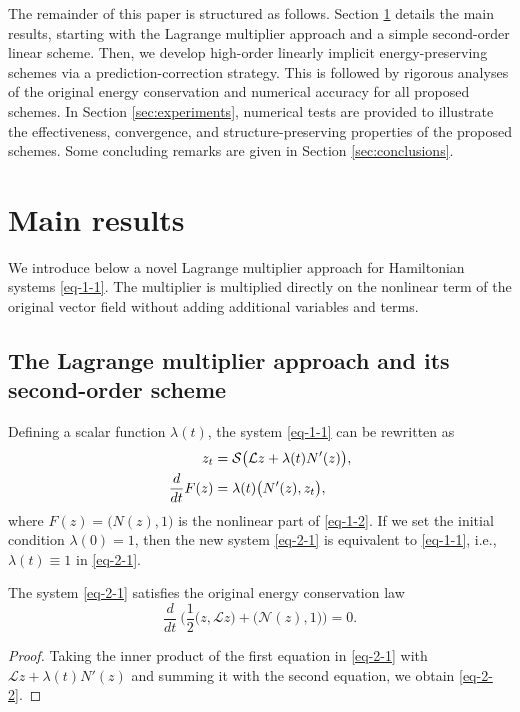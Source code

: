 \documentclass[onefignum,onetabnum]{siamart}
\begin{document}
The remainder of this paper is structured as follows. Section \ref{sec:main} details the main results, starting with the Lagrange multiplier approach and a simple second-order linear scheme. Then, we develop high-order linearly implicit energy-preserving schemes via a prediction-correction strategy. This is followed by rigorous analyses of the original energy conservation and numerical accuracy for all proposed schemes. In Section \ref{sec:experiments}, numerical tests are provided to illustrate the effectiveness, convergence, and structure-preserving properties of the proposed schemes. Some concluding remarks are given in Section \ref{sec:conclusions}. 

\section{Main results}\label{sec:main}
We introduce below a novel Lagrange multiplier approach for Hamiltonian systems \eqref{eq-1-1}. The multiplier is multiplied directly on the nonlinear term of the original vector field without adding additional variables and terms.
\subsection{The Lagrange multiplier approach and its second-order scheme} 
Defining a scalar function $\lambda(t)$, the system \eqref{eq-1-1} can be rewritten as
\begin{align}\label{eq-2-1}
	\aligned
	z_t&=\mathcal{S}\big(\mathcal{L}z+\lambda(t)N'(z)\big),\\
	\frac{d}{dt}F(z)&=\lambda(t)\big(N'(z),z_t\big),
	\endaligned
\end{align}
where $F(z)=\big(N(z),1\big)$ is the nonlinear part of \eqref{eq-1-2}. If we set the initial condition $\lambda(0)=1$, then the new system \eqref{eq-2-1} is equivalent to \eqref{eq-1-1}, i.e., $\lambda(t)\equiv 1$ in \eqref{eq-2-1}. 
\begin{theorem}\label{Th-2-1}
The system \eqref{eq-2-1} satisfies the original energy conservation law
\begin{equation}\label{eq-2-2}
	\frac{d}{dt}~\Big(\frac{1}{2}\big(z,\mathcal{L}z\big)+\big(\mathcal{N}(z),1\big)\Big)=0.
\end{equation} 
\end{theorem}
\begin{proof}
Taking the inner product of the first equation in \eqref{eq-2-1} with $\mathcal{L}z+\lambda(t) N'(z)$ and summing it with the second equation, we obtain \eqref{eq-2-2}.
\end{proof}
\end{document}
